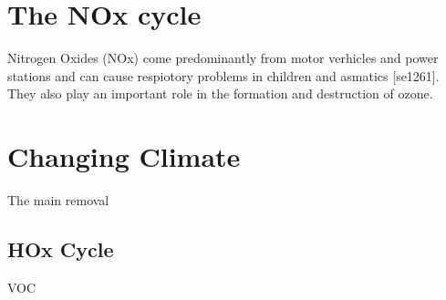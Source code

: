 \section{The NOx cycle}
Nitrogen Oxides (NOx) come predominantly from motor verhicles and power stations and can cause respiotory problems in children and asmatics [se1261]. They also play an important role in the formation and destruction of ozone.



\section{Changing Climate}



The main removal

\subsection{HOx Cycle}








VOC
